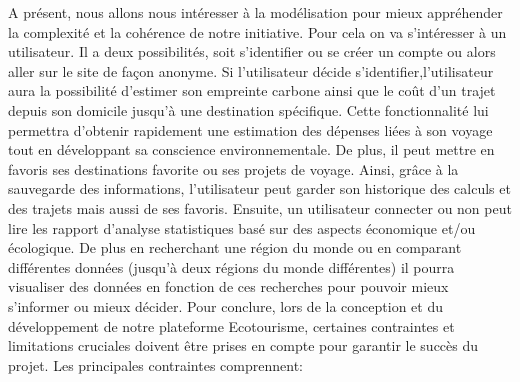 \documentclass[mstat,12pt]{unswthesis}
\begin{document}
\begin{adjustwidth}{-2cm}{}
A présent, nous allons nous intéresser à la modélisation pour mieux
appréhender la complexité et la cohérence de notre initiative. Pour cela
on va s'intéresser à un utilisateur. Il a deux possibilités, soit
s'identifier ou se créer un compte ou alors aller sur le site de façon
anonyme. Si l'utilisateur décide s'identifier,l'utilisateur aura la
possibilité d'estimer son empreinte carbone ainsi que le coût d'un
trajet depuis son domicile jusqu'à une destination spécifique. Cette
fonctionnalité lui permettra d'obtenir rapidement une estimation des
dépenses liées à son voyage tout en développant sa conscience
environnementale. De plus, il peut mettre en favoris ses destinations
favorite ou ses projets de voyage. Ainsi, grâce à la sauvegarde des
informations, l'utilisateur peut garder son historique des calculs et
des trajets mais aussi de ses favoris. Ensuite, un utilisateur connecter
ou non peut lire les rapport d'analyse statistiques basé sur des aspects
économique et/ou écologique. De plus en recherchant une région du monde
ou en comparant différentes données (jusqu'à deux régions du monde
différentes) il pourra visualiser des données en fonction de ces
recherches pour pouvoir mieux s'informer ou mieux décider. Pour
conclure, lors de la conception et du développement de notre plateforme
Ecotourisme, certaines contraintes et limitations cruciales doivent être
prises en compte pour garantir le succès du projet. Les principales
contraintes comprennent:


\end{adjustwidth}
\end{document}
